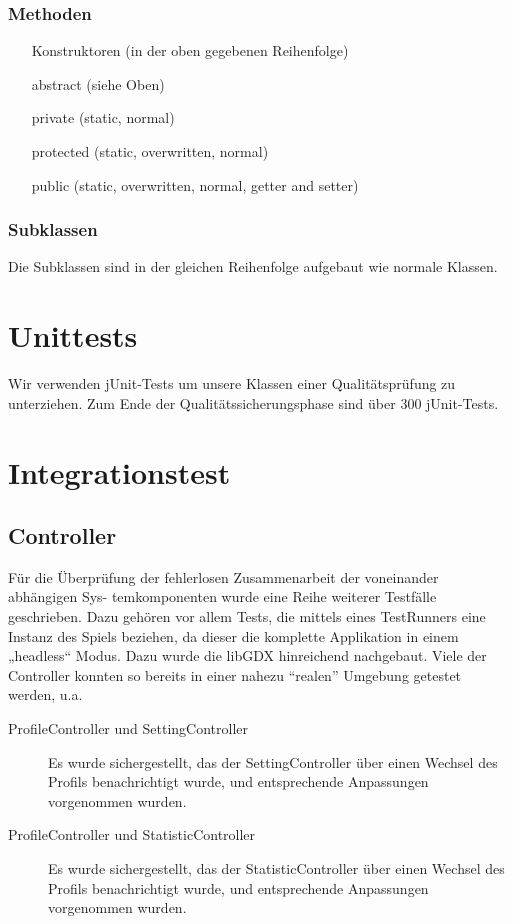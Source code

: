 \documentclass[parskip=full]{scrreprt}
\begin{document}
\subsection{Methoden}
\begin{enumerate}
	\item[Konstruktoren] (in der oben gegebenen Reihenfolge)
	\item[abstract] (siehe Oben)
	\item[private] (static, normal)
	\item[protected] (static, overwritten, normal)
	\item[public] (static, overwritten, normal, getter and setter)
\end{enumerate}
\subsection{Subklassen}
Die Subklassen sind in der gleichen Reihenfolge aufgebaut wie normale Klassen.



\chapter{Unittests}

Wir verwenden jUnit-Tests um unsere Klassen einer Qualitätsprüfung zu unterziehen. Zum Ende der Qualitätssicherungsphase sind über 300 jUnit-Tests.

\chapter{Integrationstest}



\section{Controller}

Für die Überprüfung der fehlerlosen Zusammenarbeit der voneinander abhängigen Sys- temkomponenten wurde eine Reihe weiterer Testfälle geschrieben. Dazu gehören vor allem Tests, die mittels eines TestRunners eine Instanz des Spiels beziehen, da dieser die komplette Applikation in einem „headless“ Modus. Dazu wurde die libGDX hinreichend nachgebaut. Viele der Controller konnten so bereits in einer nahezu \enquote{realen} Umgebung getestet werden, u.a.

\begin{description}
	\item[ProfileController und SettingController] Es wurde sichergestellt, das der SettingController über einen Wechsel des Profils benachrichtigt wurde, und entsprechende Anpassungen vorgenommen wurden.
	\item[ProfileController und StatisticController] Es wurde sichergestellt, das der StatisticController über einen Wechsel des Profils benachrichtigt wurde, und entsprechende Anpassungen vorgenommen wurden.
\end{description}
\end{document}
